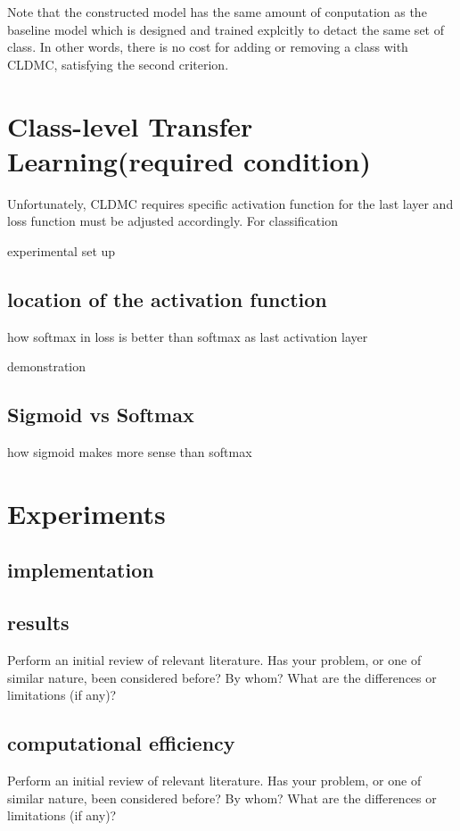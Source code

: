 \documentclass{article}
\begin{document}
Note that the constructed model has the same amount of conputation as the baseline model which is designed and trained explcitly to detact the same set of class. In other words, there is no cost for adding or removing a class with CLDMC, satisfying the second criterion.

\section{Class-level Transfer Learning(required condition)}

Unfortunately, CLDMC requires specific activation function for the last layer and loss function must be adjusted accordingly. For classification 

experimental set up

\subsection{location of the activation function}

how softmax in loss is better than softmax as last activation layer

demonstration

\subsection{Sigmoid vs Softmax}

how sigmoid makes more sense than softmax

\section{Experiments}

\subsection{implementation}

\subsection{results}
Perform an initial review of relevant literature. Has your problem, or one of similar nature, been considered before? By whom? What are the differences or limitations (if any)?

\subsection{computational efficiency}
Perform an initial review of relevant literature. Has your problem, or one of similar nature, been considered before? By whom? What are the differences or limitations (if any)?
\end{document}

